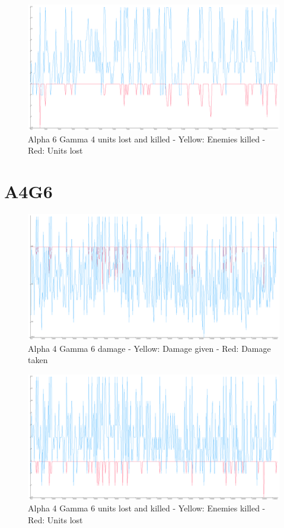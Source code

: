 \begin{figure}[H]
\includegraphics[angle=-90, scale=0.25]{Figures/learningrate/A6G4/units_lost_and_killed.png}
\caption{Alpha 6 Gamma 4 units lost and killed - Yellow: Enemies killed - Red: Units lost}
\label{fig:app_a6g4_lak}
\end{figure}	


\section{A4G6}
\begin{figure}[H]
\includegraphics[angle=-90, scale=0.25]{Figures/learningrate/A4G6/damage.png}
\caption{Alpha 4 Gamma 6 damage - Yellow: Damage given - Red: Damage taken}
\label{fig:app_a4g6_damage}
\end{figure}	

\begin{figure}[H]
\includegraphics[angle=-90, scale=0.25]{Figures/learningrate/A4G6/units_lost_and_units_killed.png}
\caption{Alpha 4 Gamma 6 units lost and killed - Yellow: Enemies killed - Red: Units lost}
\label{fig:app_a4g6_lak}
\end{figure}	

